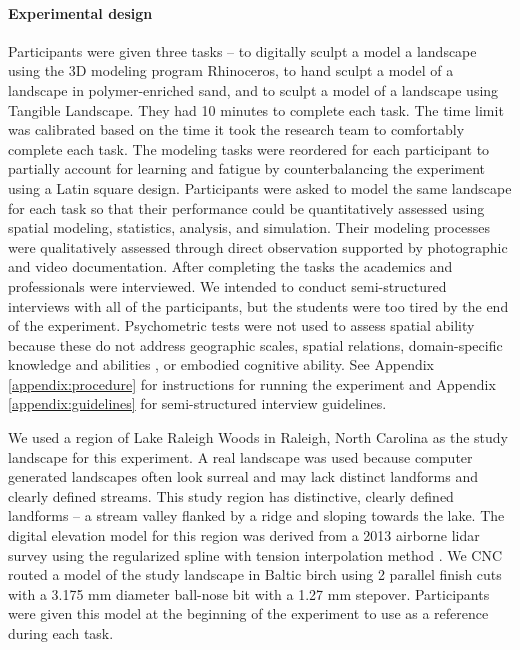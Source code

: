\documentclass[prodmode,acmtochi]{acmsmall} %
\begin{document}
\paragraph{Experimental design}
Participants were given three tasks -- 
to digitally sculpt a model a landscape using the 3D modeling program Rhinoceros, 
to hand sculpt a model of a landscape in polymer-enriched sand,
and to sculpt a model of a landscape using Tangible Landscape.
They had 10 minutes to complete each task. 
The time limit was calibrated based on 
the time it took the research team 
to comfortably complete each task. 
The modeling tasks were reordered for each participant
to partially account for learning and fatigue
by counterbalancing the experiment using a Latin square design.
Participants were asked to model the same landscape for each task 
so that their performance could be quantitatively assessed 
using spatial modeling, statistics, analysis, and simulation.
Their modeling processes were qualitatively assessed 
through direct observation
supported by photographic and video documentation. 
% 
After completing the tasks
the academics and professionals 
were interviewed. 
We intended to conduct semi-structured interviews 
with all of the participants, but
the students were too tired by the end of the experiment. 
%
Psychometric tests were not used
to assess spatial ability because
these do not address 
geographic scales,
spatial relations,
domain-specific knowledge and abilities 
\cite{Lee2009,Bednarz2011,Wakabayashi2011},
or embodied cognitive ability. 
%
See Appendix 
\ref{appendix:procedure} for instructions for running the experiment
and Appendix 
\ref{appendix:guidelines} for semi-structured interview guidelines. 

We used a region of Lake Raleigh Woods in Raleigh, North Carolina 
as the study landscape for this experiment. 
A real landscape was used because computer generated landscapes 
often look surreal and may lack distinct landforms and clearly defined streams. 
This study region has distinctive, 
clearly defined landforms -- a stream valley flanked by a ridge and sloping towards the lake.
The digital elevation model for this region was derived from a 2013 airborne lidar survey 
using the regularized spline with tension interpolation method \cite{Mitasova2005}. 
We CNC routed a model of the study landscape in Baltic birch 
using 2 parallel finish cuts 
with a 3.175 mm diameter ball-nose bit
with a 1.27 mm stepover. 
Participants were given this model 
at the beginning of the experiment
to use as a reference during each task.
\end{document}
